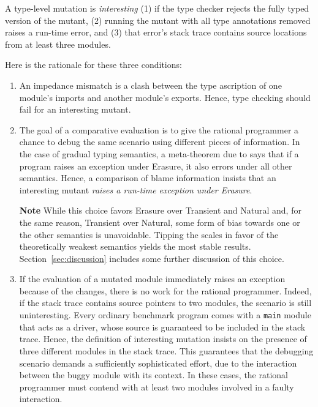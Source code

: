 
A type-level mutation is {\em interesting\/} (1) if the type checker rejects the fully typed version of the mutant,
(2) running the mutant with all type annotations removed raises a run-time error, and
(3) that error's stack trace contains source locations from at least three modules.

Here is the rationale for these three conditions:
\begin{enumerate}

\item An impedance mismatch is a clash between the type ascription of one
module's imports and another module's exports. Hence, type checking should fail
for an interesting mutant.

\item The goal of a comparative evaluation is to give the rational programmer a
chance to debug the same scenario using different pieces of information.  In the
case of gradual typing semantics, a meta-theorem due to \citet{gf-icfp-2018} says that if a program raises an exception under
Erasure, it also errors under all other semantics.  Hence, a comparison of blame
information insists that an interesting mutant {\em raises a run-time exception
under Erasure\/}.

{\bf Note} While this choice favors Erasure over Transient and Natural and, for
the same reason, Transient over Natural, some form of bias towards one or the
other semantics is unavoidable. Tipping the scales in favor of the theoretically
weakest semantics yields the most stable results. 
Section~\ref{sec:discussion} includes some further discussion of this choice.


\item If the evaluation of a mutated module immediately raises an exception because
of the changes, there is no work for the rational programmer. Indeed, if the
stack trace contains source pointers to two modules, the scenario is still
uninteresting. Every ordinary benchmark program comes with a {\tt main} module
that acts as a driver, whose source is guaranteed to be included in the stack
trace.  Hence, the definition of interesting mutation insists on the presence of
three different modules in the stack trace. This guarantees that the debugging
scenario demands a sufficiently sophisticated effort, due to the interaction
between the buggy module with its context.  In these cases, the rational
programmer must contend with at least two modules involved in a faulty
interaction.

\end{enumerate}

